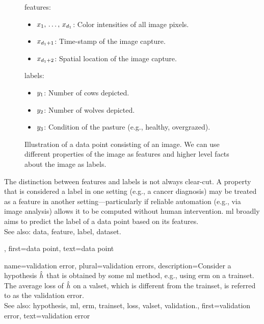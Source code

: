 {{\begin{figure}[H]
\begin{minipage}[t]{0.95\textwidth}
        			\Glspl{feature}:
        			\begin{itemize}
            			\item $x_{1}, \,\ldots, \,x_{d_{1}}$: Color intensities of all image pixels.
            			\item $x_{d_{1}+1}$: Time-stamp of the image capture.
            			\item $x_{d_{1}+2}$: Spatial location of the image capture.
			\end{itemize}
			\Glspl{label}:
            		\begin{itemize}
               	 		\item $y_{1}$: Number of cows depicted. 
                			\item $y_{2}$: Number of wolves depicted. 
                			\item $y_{3}$: Condition of the pasture (e.g., healthy, overgrazed).
            		\end{itemize}
    			\end{minipage}
    			\caption{Illustration of a \gls{data} point consisting of an image. We can use 
			different properties of the image as \glspl{feature} and higher level facts
			about the image as \glspl{label}.\label{fig:datapoint_cowherd_dict}}
		\end{figure}
 		The distinction between \glspl{feature} and \glspl{label} is not always clear-cut. 
 		A property that is considered a \gls{label} in one setting (e.g., a cancer diagnosis) 
 		may be treated as a \gls{feature} in another setting—particularly if reliable automation (e.g., 
 		via image analysis) allows it to be computed without human intervention.
   		\Gls{ml} broadly aims to predict the \gls{label} of a \gls{data} point based on its \glspl{feature}. 
				\\
		See also: \gls{data}, \gls{feature}, \gls{label}, \gls{dataset}.}, 
	first={data point},
	text={data point}  
}


{name={validation error}, plural={validation errors},
 	description={Consider a \gls{hypothesis} $\hat{h}$ that is 
 		obtained by some \gls{ml} method, e.g., using \gls{erm} on a \gls{trainset}. The average \gls{loss} 
 		of $\hat{h}$ on a \gls{valset}, which is different from the \gls{trainset}, is referred 
 		to as the \gls{validation} error.
			\\
		See also: \gls{hypothesis}, \gls{ml}, \gls{erm}, \gls{trainset}, \gls{loss}, \gls{valset}, \gls{validation}.},
	first={validation error},
	text={validation error}  
}

